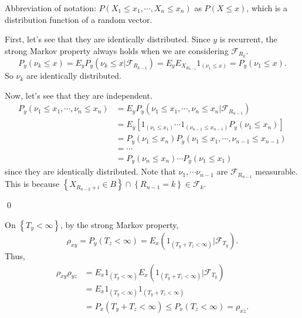 \begin{problem}[5.3.1] \hfill

	Abbreviation of notation: $P(X_1 \leq x_1, \cdots, X_n \leq x_n)$ as $P(X \leq x)$, which is a distribution function of a random vector.

	First, let's see that they are identically distributed.
	Since $y$ is recurrent, the strong Markov property always holds when we are considering $\mathcal{F}_{R_k}$.
	\[
		P_y (\nu_k \leq x ) = E_y P_y(\nu_k \leq x \lvert \mathcal{F}_{R_{k-1}})
			= E_y E_{X_{R_{k-1}}} 1_{(\nu_1 \leq x)} = P_y(\nu_1 \leq x).
	\]
	So $\nu_k$ are identically distributed.

	Now, let's see that they are independent.
	\[
		\begin{split}
			P_y (\nu_1 \leq x_1 , \cdots, \nu_n \leq x_n)
			&= E_y P_y (\nu_1 \leq x_1, \cdots, \nu_n \leq x_n \lvert \mathcal{F}_{R_{n-1}}) \\
			&= E_y\left[ 1_{\left( \nu_1 \leq x_1 \right)}\cdots 1_{\left( \nu_{n-1} \leq x_{n-1} \right)} P_y(\nu_1 \leq x_n) \right] \\
			&= P_y(\nu_1 \leq x_n) P_y(\nu_1 \leq x_1 , \cdots, \nu_{n-1} \leq x_{n-1}) \\
			&= \cdots \\
			&= P_y(\nu_n \leq x_n) \cdots P_y(\nu_1 \leq x_1)
		\end{split}
	\]
	since they are identically distributed.
	Note that $\nu_1, \cdots \nu_{n-1}$ are $\mathcal{F}_{R_{n-1}}$ measurable.
	This is because $\left\{ X_{R_{n-2}+i} \in B \right\} \cap \left\{ R_{n-1} = k \right\} \in \mathcal{F}_k.$

	\qed
\end{problem}

\begin{problem}[5.3.2] \hfill
	
	On $\left\{ T_y < \infty \right\}$, by the strong Markov property,
	\[
		\rho_{xy} = P_y(T_z < \infty) = E_x\left( 1_{\left( T_y + T_z < \infty \right)} \lvert \mathcal{F}_{T_y} \right).
	\]
	Thus,
	\[
		\begin{split}
			\rho_{xy}\rho_{yz}
			&= E_x1_{\left( T_y < \infty \right)}E_x\left( 1_{\left( T_y + T_z < \infty \right)} \lvert \mathcal{F}_{T_y} \right)\\
			&= E_x 1_{\left( T_y < \infty \right)} 1_{\left( T_y + T_z < \infty\right)} \\
			&= P_x\left( T_y + T_z < \infty \right) \leq P_x\left( T_z < \infty \right) = \rho_{xz}.
		\end{split}
	\]
\end{problem}

